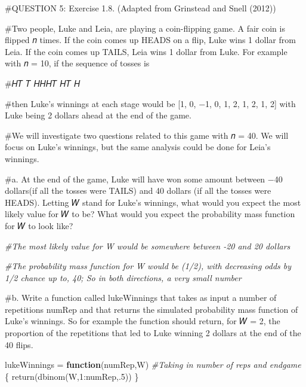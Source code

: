 \documentclass[
]{article}
\newenvironment{Shaded}{\begin{snugshade}}{\end{snugshade}}
\newcommand{\CommentTok}[1]{\textcolor[rgb]{0.56,0.35,0.01}{\textit{#1}}}
\newcommand{\ControlFlowTok}[1]{\textcolor[rgb]{0.13,0.29,0.53}{\textbf{#1}}}
\newcommand{\DecValTok}[1]{\textcolor[rgb]{0.00,0.00,0.81}{#1}}
\newcommand{\FunctionTok}[1]{\textcolor[rgb]{0.00,0.00,0.00}{#1}}
\newcommand{\NormalTok}[1]{#1}
\newcommand{\OtherTok}[1]{\textcolor[rgb]{0.56,0.35,0.01}{#1}}
\newcommand{\SpecialCharTok}[1]{\textcolor[rgb]{0.00,0.00,0.00}{#1}}
\begin{document}
\#QUESTION 5: Exercise 1.8. (Adapted from Grinstead and Snell (2012))

\#Two people, Luke and Leia, are playing a coin-flipping game. A fair
coin is flipped 𝑛 times. If the coin comes up HEADS on a flip, Luke wins
1 dollar from Leia. If the coin comes up TAILS, Leia wins 1 dollar from
Luke. For example with 𝑛 = 10, if the sequence of tosses is

\#𝐻𝑇 𝑇 𝐻𝐻𝐻𝑇 𝐻𝑇 𝐻

\#then Luke's winnings at each stage would be {[}1, 0, −1, 0, 1, 2, 1,
2, 1, 2{]} with Luke being 2 dollars ahead at the end of the game.

\#We will investigate two questions related to this game with 𝑛 = 40. We
will focus on Luke's winnings, but the same analysis could be done for
Leia's winnings.

\#a. At the end of the game, Luke will have won some amount between −40
dollars(if all the tosses were TAILS) and 40 dollars (if all the tosses
were HEADS). Letting 𝑊 stand for Luke's winnings, what would you expect
the most likely value for 𝑊 to be? What would you expect the probability
mass function for 𝑊 to look like?

\begin{Shaded}
\begin{Highlighting}[]
\CommentTok{\#The most likely value for W would be somewhere between {-}20 and 20 dollars}

\CommentTok{\#The probability mass function for W would be (1/2), with decreasing odds by 1/2 chance up to, 40; So in both directions, a very small number}
\end{Highlighting}
\end{Shaded}

\#b. Write a function called lukeWinnings that takes as input a number
of repetitions numRep and that returns the simulated probability mass
function of Luke's winnings. So for example the function should return,
for 𝑊 = 2, the proportion of the repetitions that led to Luke winning 2
dollars at the end of the 40 flips.

\begin{Shaded}
\begin{Highlighting}[]
\NormalTok{lukeWinnings }\OtherTok{=} \ControlFlowTok{function}\NormalTok{(numRep,W) }\CommentTok{\#Taking in number of reps and endgame}
\NormalTok{\{}
  \FunctionTok{return}\NormalTok{(}\FunctionTok{dbinom}\NormalTok{(W,}\DecValTok{1}\SpecialCharTok{:}\NormalTok{numRep,.}\DecValTok{5}\NormalTok{))}
\NormalTok{\}}
\end{Highlighting}
\end{Shaded}
\end{document}
